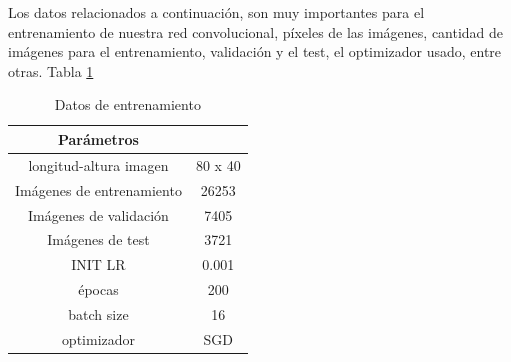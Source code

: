 Los datos relacionados a continuación, son muy importantes para el entrenamiento de nuestra red convolucional, píxeles de las imágenes, cantidad de imágenes para el entrenamiento, validación y el test, el optimizador usado, entre otras. Tabla \ref{table:Hiperparametros Chars74K}

\begin{table}[H]
\begin{center}
\begin{tabular}{||c|c||}
\hline \hline
 Parámetros &  \\
\hline \hline
longitud-altura imagen & 80 x 40\\\hline
Imágenes de entrenamiento & 26253 \\ \hline
Imágenes de validación & 7405\\\hline
Imágenes de test & 3721\\\hline
INIT LR & 0.001 \\\hline
épocas & 200 \\\hline
batch size & 16\\ \hline
optimizador & SGD\\
\hline
\hline
\end{tabular}
\caption{\label{table:Hiperparametros Chars74K} Datos de entrenamiento}
\end{center}
\end{table}




